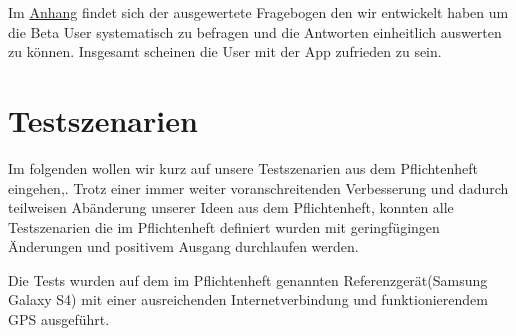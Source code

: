 \documentclass{scrartcl}
\begin{document}
		Im \hyperlink{Anhang}{Anhang} findet sich der ausgewertete Fragebogen den wir entwickelt haben um die Beta User systematisch zu befragen und die Antworten einheitlich auswerten zu können. Insgesamt scheinen die User mit der App zufrieden zu sein.

\newpage
\section{Testszenarien}
Im folgenden wollen wir kurz auf unsere Testszenarien aus dem Pflichtenheft eingehen,.
Trotz einer immer weiter voranschreitenden Verbesserung und dadurch teilweisen Abänderung unserer Ideen aus dem Pflichtenheft, konnten alle Testszenarien die im Pflichtenheft definiert wurden mit geringfügingen Änderungen und positivem Ausgang durchlaufen werden.

Die Tests wurden auf dem im Pflichtenheft genannten Referenzgerät(Samsung Galaxy S4) mit einer ausreichenden Internetverbindung und funktionierendem GPS ausgeführt. \newline
\end{document}
